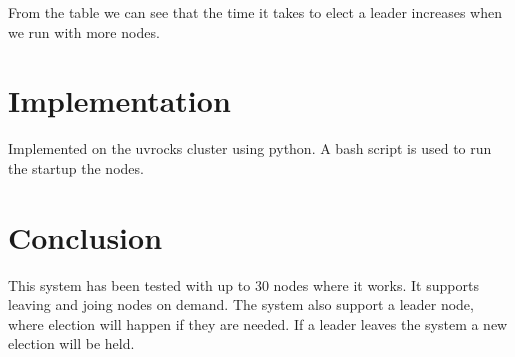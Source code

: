 From the table we can see that the time it takes to elect a leader increases when we run with more nodes.


\section{Implementation}
Implemented on the uvrocks cluster using python. A bash script is used to run the startup the nodes.


\section{Conclusion}
This system has been tested with up to 30 nodes where it works. It supports leaving and joing nodes on demand.
The system also support a leader node, where election will happen if they are needed. If a leader leaves the system a new election will be held.








